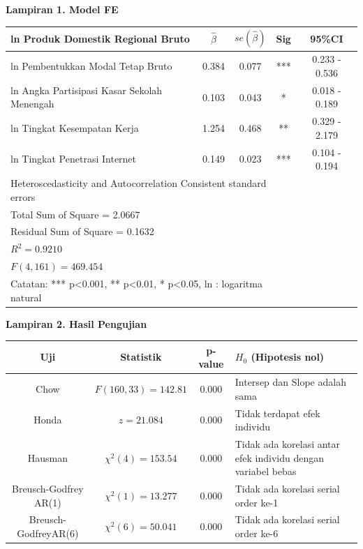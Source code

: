 \newpage
\singlespacing

\textbf{Lampiran 1. Model FE}

\begin{table}[h]
\centering
    \begin{tabular}[t]{p{7cm}cccc}
    \toprule
    ln Produk Domestik Regional Bruto & $\hat{\beta}$ & $se(\hat{\beta})$ & Sig & 95\%CI \\
    \midrule
    ln Pembentukkan Modal Tetap Bruto & 0.384  & 0.077  & ***  & 0.233 - 0.536 \\
    ln Angka Partisipasi Kasar Sekolah Menengah & 0.103  & 0.043  & *    & 0.018 - 0.189 \\
    ln Tingkat Kesempatan Kerja & 1.254  & 0.468  & **   & 0.329 - 2.179 \\
    ln Tingkat Penetrasi Internet & 0.149  & 0.023  & ***  & 0.104 - 0.194 \\
    \midrule
        \multicolumn{4}{l}{Heteroscedasticity and Autocorrelation Consistent standard errors}\\
    \midrule
        \multicolumn{4}{l}{Total Sum of Square = 2.0667} \\
        \multicolumn{4}{l}{Residual Sum of Square = 0.1632} \\
        \multicolumn{4}{l}{$R^{2}= 0.9210$} \\
        \multicolumn{4}{l}{$F(4, 161) = 469.454$} \\
    \midrule
        \multicolumn{4}{l}{Catatan: *** p<0.001, ** p<0.01, * p<0.05, ln : logaritma natural}\\
    \bottomrule
    \end{tabular}
\end{table}


\textbf{Lampiran 2. Hasil Pengujian}

\begin{center}
\begin{tabular}{cccp{5cm}}
\toprule
Uji                 & Statistik             & p-value  & $H_0$ (Hipotesis nol) \\
\midrule
Chow                & $F(160, 33) = 142.81$ & 0.000    & Intersep dan Slope adalah sama \\
Honda               & $z = 21.084$          & 0.000    & Tidak terdapat efek individu    \\
Hausman             & $\chi^2(4) = 153.54$  & 0.000    & Tidak ada korelasi antar efek individu dengan variabel bebas\\
Breusch-Godfrey AR(1) & $\chi^2(1) = 13.277$  & 0.000    & Tidak ada korelasi serial order ke-1    \\
Breusch-GodfreyAR(6) & $\chi^2(6) = 50.041$  & 0.000    & Tidak ada korelasi serial order ke-6    \\
\bottomrule
\end{tabular}
\end{center}

